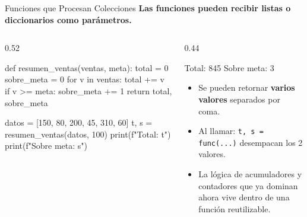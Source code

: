 \documentclass[aspectratio=169, 11pt]{beamer}
\begin{document}
\begin{frame}[fragile,shrink=30]{Funciones que Procesan Colecciones}
  \vspace{-6pt}
  {\footnotesize\color{arcaDark}\bfseries
    Las funciones pueden recibir listas o diccionarios como parámetros.}

  \vspace{2pt}
  \begin{columns}[T]
    \begin{column}{0.52\textwidth}
      \begin{pyblock}
def resumen_ventas(ventas, meta):
    total = 0
    sobre_meta = 0
    for v in ventas:
        total += v
        if v >= meta:
            sobre_meta += 1
    return total, sobre_meta

datos = [150, 80, 200, 45, 310, 60]
t, s = resumen_ventas(datos, 100)
print(f"Total: {t}")
print(f"Sobre meta: {s}")
      \end{pyblock}
    \end{column}

    \begin{column}{0.44\textwidth}
      \vspace{2pt}
      \begin{outputblock}
Total: 845
Sobre meta: 3
      \end{outputblock}

      \vspace{2pt}
      {\scriptsize\color{textMuted}
      \begin{itemize}\setlength{\itemsep}{3pt}
        \item[{\color{arcaRed}\scriptsize\faArrowRight}]
          Se pueden retornar \textbf{varios valores}
          separados por coma.
        \item[{\color{arcaRed}\scriptsize\faArrowRight}]
          Al llamar: \texttt{t, s = func(...)}
          desempacan los 2 valores.
        \item[{\color{arcaRed}\scriptsize\faLightbulb}]
          La lógica de acumuladores y contadores
          que ya dominan ahora vive
          dentro de una función reutilizable.
      \end{itemize}
      }
    \end{column}
  \end{columns}
\end{frame}
\end{document}
